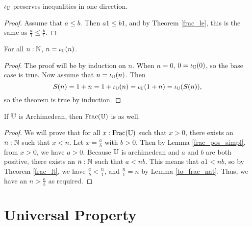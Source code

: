 \documentclass[../../math.tex]{subfiles}
\begin{document}
\begin{instance}
    $\iota_{\mathbb{U}}$ preserves inequalities in one direction.
\end{instance}
\begin{proof}
    Assume that $a \leq b$.  Then $a1 \leq b1$, and by Theorem \ref{frac_le},
    this is the same as $\frac{a}{1} \leq \frac{b}{1}$.
\end{proof}

\begin{lemma} \label{to_frac_nat}
    For all $n : \mathbb{N}$, $n = \iota_{\mathbb{U}}(n)$.
\end{lemma}
\begin{proof}
    The proof will be by induction on $n$.  When $n = 0$, $0 = \iota_{\mathbb{U}}(0)$, so
    the base case is true.  Now assume that $n = \iota_{\mathbb{U}}(n)$.  Then
    \[
        S(n) = 1 + n = 1 + \iota_{\mathbb{U}}(n) = \iota_{\mathbb{U}}(1 + n) = \iota_{\mathbb{U}}(S(n)),
    \]
    so the theorem is true by induction.
\end{proof}

\begin{instance}
    If $\mathbb{U}$ is Archimedean, then $\operatorname{Frac}(\mathbb{U})$ is as well.
\end{instance}
\begin{proof}
    We will prove that for all $x : \operatorname{Frac}(\mathbb{U})$ such that $x > 0$, there exists
    an $n : \mathbb{N}$ such that $x < n$.  Let $x = \frac{a}{b}$ with $b > 0$.  Then by
    Lemma \ref{frac_pos_simpl}, from $x > 0$, we have $a > 0$.  Because $\mathbb{U}$ is
    archimedean and $a$ and $b$ are both positive, there exists an $n : \mathbb{N}$ such
    that $a < nb$.  This means that $a1 < nb$, so by Theorem \ref{frac_lt}, we
    have $\frac{a}{b} < \frac{n}{1}$, and $\frac{n}{1} = n$ by Lemma
    \ref{to_frac_nat}.  Thus, we have an $n > \frac{a}{b}$ as required.
\end{proof}

\section{Universal Property}
\end{document}
